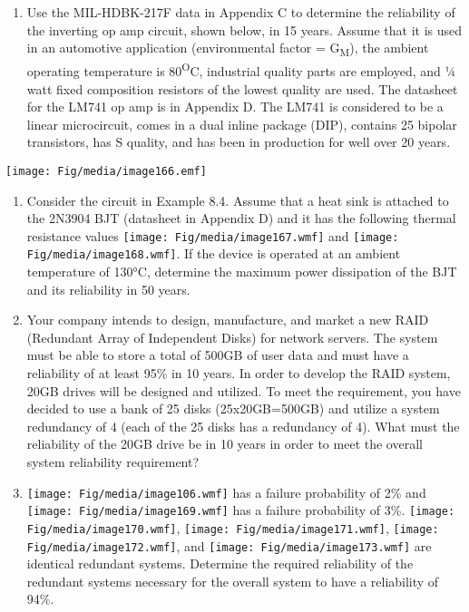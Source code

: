 \begin{enumerate}
\def\labelenumi{\arabic{enumi}.}
\setcounter{enumi}{7}
\item
  Use the MIL-HDBK-217F data in Appendix C to determine the reliability
  of the inverting op amp circuit, shown below, in 15 years. Assume that
  it is used in an automotive application (environmental factor =
  G\textsubscript{M}), the ambient operating temperature is
  80\textsuperscript{O}C, industrial quality parts are employed, and ¼
  watt fixed composition resistors of the lowest quality are used. The
  datasheet for the LM741 op amp is in Appendix D. The LM741 is
  considered to be a linear microcircuit, comes in a dual inline package
  (DIP), contains 25 bipolar transistors, has S quality, and has been in
  production for well over 20 years.
\end{enumerate}

\texttt{[image: Fig/media/image166.emf]}

\begin{enumerate}
\def\labelenumi{\arabic{enumi}.}
\setcounter{enumi}{8}
\item
  Consider the circuit in Example 8.4. Assume that a heat sink is
  attached to the 2N3904 BJT (datasheet in Appendix D) and it has the
  following thermal resistance values
  \texttt{[image: Fig/media/image167.wmf]} and
  \texttt{[image: Fig/media/image168.wmf]}. If the device is operated at
  an ambient temperature of 130°C, determine the maximum power
  dissipation of the BJT and its reliability in 50 years.
\item
  Your company intends to design, manufacture, and market a new RAID
  (Redundant Array of Independent Disks) for network servers. The system
  must be able to store a total of 500GB of user data and must have a
  reliability of at least 95\% in 10 years. In order to develop the RAID
  system, 20GB drives will be designed and utilized. To meet the
  requirement, you have decided to use a bank of 25 disks
  (25x20GB=500GB) and utilize a system redundancy of 4 (each of the 25
  disks has a redundancy of 4). What must the reliability of the 20GB
  drive be in 10 years in order to meet the overall system reliability
  requirement?
\item
  \texttt{[image: Fig/media/image106.wmf]} has a failure probability of
  2\% and \texttt{[image: Fig/media/image169.wmf]} has a failure
  probability of 3\%. \texttt{[image: Fig/media/image170.wmf]},
  \texttt{[image: Fig/media/image171.wmf]},
  \texttt{[image: Fig/media/image172.wmf]}, and
  \texttt{[image: Fig/media/image173.wmf]} are identical redundant
  systems. Determine the required reliability of the redundant systems
  necessary for the overall system to have a reliability of 94\%.
\end{enumerate}

